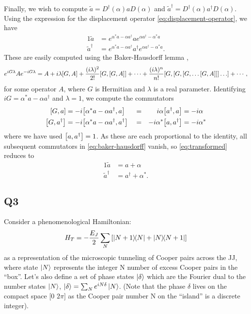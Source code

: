 \documentclass[12pt]{article}
\begin{document}
\begin{appendices}
Finally, we wish to compute $\tilde{a} = D^\dag(\alpha) a D(\alpha)$ and $\tilde{a}^\dag = D^\dag(\alpha) a^\dag D(\alpha)$. Using the expression for the displacement operator \eqref{eq:displacement-operator}, we have
\begin{alignat}{1}
    \tilde{a} &= e^{\alpha^*a - \alpha a^\dag} a e^{\alpha a^\dag - \alpha^* a} \\
    \tilde{a}^\dag &= e^{\alpha^*a - \alpha a^\dag} a^\dag e^{\alpha a^\dag - \alpha^* a}.
    \label{eq:transformed}
\end{alignat}
These are easily computed using the Baker-Hausdorff lemma \cite[Eq. 2.3.47]{sakurai},
\begin{equation}
    e^{iG\lambda}Ae^{-iG\lambda}
    = A + i\lambda\comm{G}{A}
    + \frac{(i\lambda)^2}{2!}\comm{G}{\comm{G}{A}} + \cdots
    + \frac{(i\lambda)^n}{n!} \comm{G}{\comm{G}{\comm{G}{\ldots\comm{G}{A}}}\ldots} + \cdots,
    \label{eq:baker-hausdorff}
\end{equation}
for some operator $A$, where $G$ is Hermitian and $\lambda$ is a real parameter. Identifying $iG = \alpha^*a - \alpha a^\dag$ and $\lambda = 1$, we compute the commutators
\begin{alignat}{3}
    \comm{G}{a} &= -i\comm{\alpha^*a - \alpha a^\dag}{a} &&=& i\alpha\comm{a^\dag}{a} &= -i\alpha \\
    \comm{G}{a^\dag} &= -i\comm{\alpha^*a - \alpha a^\dag}{a^\dag} &&=& -i\alpha^*\comm{a}{a^\dag} &= -i\alpha^*
\end{alignat}
where we have used $\comm{a}{a^\dag} = 1$. As these are each proportional to the identity, all subsequent commutators in \eqref{eq:baker-hausdorff} vanish, so \eqref{eq:transformed} reduces to
\begin{alignat}{1}
    \tilde{a} &= a + \alpha \\
    \tilde{a}^\dag &= a^\dag + \alpha^*.
\end{alignat}




\subsection*{Q3}
Consider a phenomenological Hamiltonian:
\begin{equation}
    H_T = -\frac{E_J}{2} \sum_N
    \left[\ketbra{N+1}{N} + \ketbra{N}{N+1}\right]
\end{equation}
as a representation of the microscopic tunneling of Cooper pairs across the JJ, where state $\ket{N}$ represents the integer N number of excess Cooper pairs in the “box”. Let’s also define a set of phase states $\ket{\delta}$ which are the Fourier dual to the number states  $\ket{N}$, $
    \ket{\delta} = \sum_N e^{iN\delta}\ket{N}$. (Note that the phase $\delta$ lives on the compact space $[0 $  $ 2\pi]$ as the Cooper pair number N on the “island” is a discrete integer). 
    

\end{appendices}
\end{document}
